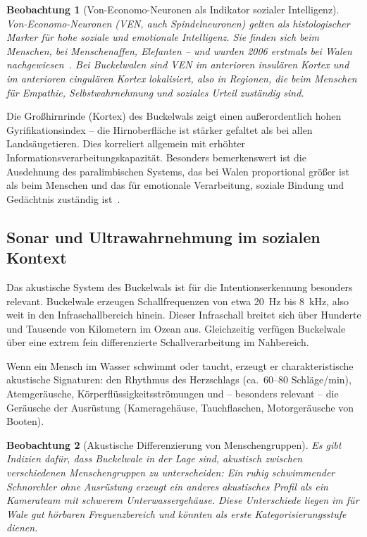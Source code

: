 ﻿\documentclass[12pt,a4paper]{article}
\newtheorem{beobachtung}{Beobachtung}[section]
\theoremstyle{definition}
\theoremstyle{remark}
\begin{document}
\begin{beobachtung}[Von-Economo-Neuronen als Indikator sozialer Intelligenz]
  \label{obs:ven}
  Von-Economo-Neuronen (VEN, auch Spindelneuronen) gelten als histologischer
  Marker für hohe soziale und emotionale Intelligenz. Sie finden sich beim
  Menschen, bei Menschenaffen, Elefanten -- und wurden 2006 erstmals bei
  Walen nachgewiesen~\cite{hof2007spindle}. Bei Buckelwalen sind VEN im
  anterioren insulären Kortex und im anterioren cingulären Kortex lokalisiert,
  also in Regionen, die beim Menschen für Empathie, Selbstwahrnehmung und
  soziales Urteil zuständig sind.
\end{beobachtung}

Die Großhirnrinde (Kortex) des Buckelwals zeigt einen außerordentlich hohen
Gyrifikationsindex -- die Hirnoberfläche ist stärker gefaltet als bei allen
Landsäugetieren. Dies korreliert allgemein mit erhöhter Informationsverarbeitungskapazität.
Besonders bemerkenswert ist die Ausdehnung des paralimbischen Systems,
das bei Walen proportional größer ist als beim Menschen und das für
emotionale Verarbeitung, soziale Bindung und Gedächtnis zuständig ist~\cite{marino2007cetacean}.

\subsection{Sonar und Ultrawahrnehmung im sozialen Kontext}

Das akustische System des Buckelwals ist für die Intentionserkennung besonders
relevant. Buckelwale erzeugen Schallfrequenzen von etwa 20~Hz bis 8~kHz, also
weit in den Infraschallbereich hinein. Dieser Infraschall breitet sich über
Hunderte und Tausende von Kilometern im Ozean aus. Gleichzeitig verfügen
Buckelwale über eine extrem fein differenzierte Schallverarbeitung im Nahbereich.

Wenn ein Mensch im Wasser schwimmt oder taucht, erzeugt er charakteristische
akustische Signaturen: den Rhythmus des Herzschlags (ca.\ 60--80 Schläge/min),
Atemgeräusche, Körperflüssigkeitsströmungen und -- besonders relevant -- die
Geräusche der Ausrüstung (Kameragehäuse, Tauchflaschen, Motorgeräusche von Booten).

\begin{beobachtung}[Akustische Differenzierung von Menschengruppen]
  \label{obs:akustik}
  Es gibt Indizien dafür, dass Buckelwale in der Lage sind, akustisch zwischen
  verschiedenen Menschengruppen zu unterscheiden: Ein ruhig schwimmender Schnorchler
  ohne Ausrüstung erzeugt ein anderes akustisches Profil als ein Kamerateam mit
  schwerem Unterwassergehäuse. Diese Unterschiede liegen im für Wale gut
  hörbaren Frequenzbereich und könnten als erste Kategorisierungsstufe dienen.
\end{beobachtung}
\end{document}

